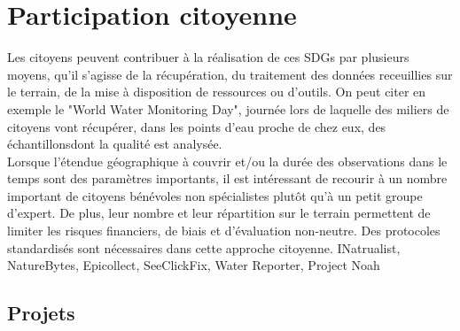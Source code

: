 \documentclass[10pt, conference, compsocconf]{llncs}
\begin{document}
\section{Participation citoyenne}
	Les citoyens peuvent contribuer à la réalisation de ces SDGs par plusieurs moyens, qu'il s'agisse de la récupération, du traitement des données receuillies sur le terrain, de la mise à disposition de ressources ou d'outils. On peut citer en exemple le "World Water Monitoring Day", journée lors de laquelle des miliers de citoyens vont récupérer, dans les points d'eau proche de chez eux, des échantillonsdont la qualité est analysée. \\
	Lorsque l'étendue géographique à couvrir et/ou la durée des observations dans le temps sont des paramètres importants, il est intéressant de recourir à un nombre important de citoyens bénévoles non spécialistes plutôt qu'à un petit groupe d'expert. De plus, leur nombre et leur répartition sur le terrain permettent de limiter les risques financiers, de biais et d'évaluation non-neutre. Des protocoles standardisés sont nécessaires dans cette approche citoyenne.
		INatrualist, NatureBytes, Epicollect, SeeClickFix, Water Reporter, Project Noah		

	\subsection{Projets}
		
\end{document}
